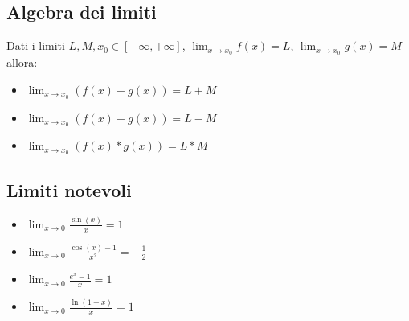 \documentclass{article}
\begin{document}
\subsection{Algebra dei limiti}

Dati i limiti $L, M, x_0 \in [ -\infty , +\infty ]$, $\lim_{x \to x_0} f(x) = L$, $\lim_{x \to x_0} g(x) = M$ allora:

\begin{itemize}
    \item $\lim_{x \to x_0} (f(x) + g(x)) = L + M$
    \item $\lim_{x \to x_0} (f(x) - g(x)) = L - M$
    \item $\lim_{x \to x_0} (f(x) * g(x)) = L * M$
\end{itemize}

\subsection{Limiti notevoli}

\begin{itemize}
    \item $\lim_{x \to 0} \frac{\sin(x)}{x} = 1$
    \item $\lim_{x \to 0} \frac{\cos(x) - 1}{x^2} = -\frac{1}{2}$
    \item $\lim_{x \to 0} \frac{e^x - 1}{x} = 1$
    \item $\lim_{x \to 0} \frac{\ln(1 + x)}{x} = 1$
\end{itemize}
\end{document}
